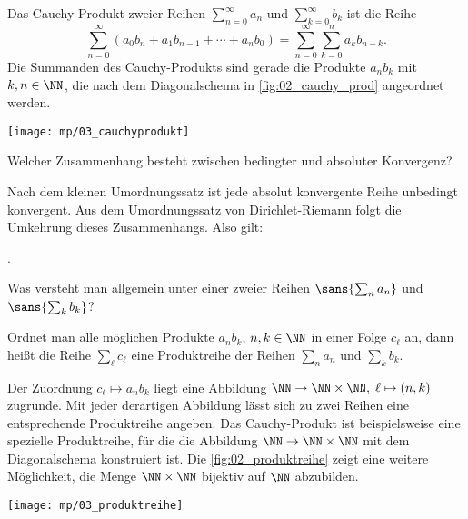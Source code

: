 \begin{antwort}[]%
  \Ant Das Cauchy-Produkt zweier Reihen $\sum_{n=0}^\infty a_n$ 
  und $\sum_{k=0}^\infty b_k$ ist die Reihe
  \[
  \sum_{n=0}^\infty ( a_0 b_n + a_1 b_{n-1} + \cdots + a_n b_0 ) = 
  \sum_{n=0}^\infty \sum_{k=0}^n a_k b_{n-k}.
  \]
  Die Summanden des Cauchy-Produkts sind gerade die  
  Produkte $a_n b_k$ mit $k,n\in \NN$, die nach dem Diagonalschema 
  in \Abb\ref{fig:02_cauchy_prod} angeordnet werden.
  \AntEnd

  \begin{center}
    \texttt{[image: mp/03\_cauchyprodukt]}
    \label{fig:02_cauchy_prod}
  \end{center}
\end{antwort}

\begin{frage}\label{02_beab}
  Welcher Zusammenhang besteht zwischen bedingter und absoluter Konvergenz?
\end{frage}

\begin{antwort}
  Nach dem kleinen Umordnungssatz ist jede absolut konvergente Reihe 
  unbedingt konvergent. Aus dem Umordnungssatz von Dirichlet-Riemann 
  folgt die Umkehrung dieses Zusammenhangs. Also gilt:

  \medskip\noindent
  . 
  \AntEnd

  \smallskip
\end{antwort}

\smallskip
\begin{frage}\label{02_pr}
  Was versteht man allgemein unter einer  zweier Reihen 
  $\sans{\sum_n a_n}$ und $\sans{\sum_k b_k}$?
\end{frage}

\begin{antwort}[]
  \Ant Ordnet man alle möglichen Produkte $a_n b_k$, $n,k\in\NN$ in einer 
  Folge $c_\ell$ an, dann heißt die Reihe $\sum_\ell c_\ell$ eine Produktreihe 
  der Reihen $\sum_n a_n$ und $\sum_k b_k$.  

  Der Zuordnung $c_\ell \mapsto a_n b_k$ 
  liegt eine  Abbildung $\NN\to \NN \times \NN, \;
  \ell \mapsto (n,k)$ zugrunde. Mit jeder derartigen Abbildung 
  lässt sich zu zwei Reihen eine entsprechende Produktreihe angeben. 
  Das Cauchy-Produkt ist beispielsweise eine spezielle 
  Produktreihe, für die die Abbildung $\NN\to \NN \times \NN$ mit dem 
  Diagonalschema konstruiert ist. Die \Abb\ref{fig:02_produktreihe} zeigt eine 
  weitere Möglichkeit, die Menge $\NN \times \NN$ 
  bijektiv auf $\NN$ abzubilden.\AntEnd

  \begin{center}
    \texttt{[image: mp/03\_produktreihe]}
    \label{fig:02_produktreihe}
  \end{center}
\end{antwort}

